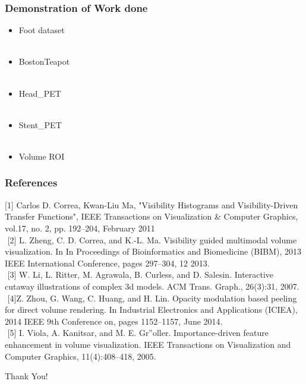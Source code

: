 \documentclass{beamer}
\begin{document}


\begin{frame}
\frametitle{Demonstration of Work done }
\begin{itemize}
\item Foot dataset \\ $ $
\item BostonTeapot \\ $ $
\item Head\_PET \\ $ $
\item Stent\_PET \\ $ $
\item Volume ROI
\end{itemize}

\end{frame}



\begin{frame}
\frametitle{References}
[1] Carlos D. Correa, Kwan-Liu Ma, "Visibility Histograms and Visibility-Driven Transfer Functions", IEEE Transactions on Visualization \& Computer Graphics, vol.17, no. 2, pp. 192--204, February 2011 \\ $ $
[2] L. Zheng, C. D. Correa, and K.-L. Ma. Visibility guided multimodal volume visualization. In In Proceedings of Bioinformatics and Biomedicine (BIBM), 2013 IEEE International Conference, pages 297–304, 12 2013. \\$ $
[3] W. Li, L. Ritter, M. Agrawala, B. Curless, and D. Salesin. Interactive cutaway illustrations of complex 3d models. ACM Trans. Graph., 26(3):31, 2007.\\$ $
[4]Z. Zhou, G. Wang, C. Huang, and H. Lin. Opacity modulation based peeling
for direct volume rendering. In Industrial Electronics and Applications (ICIEA), 2014 IEEE 9th Conference on, pages 1152–1157, June 2014. \\ $ $
[5] I. Viola, A. Kanitsar, and M. E. Gr”oller. Importance-driven feature enhancement in volume visualization. IEEE Transactions on Visualization and Computer Graphics, 11(4):408–418, 2005.

\end{frame}


\begin{frame}
\Huge{\centerline{Thank You!}}
\end{frame}

\end{document}
